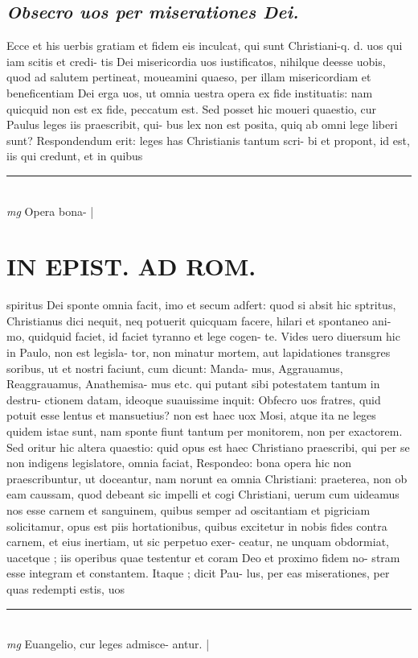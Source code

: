 \documentclass{article}
\begin{document}
\begin{pages}
\subsection*{\textit{Obsecro uos per miserationes Dei. }}\pstart Ecce et his uerbis gratiam et fidem eis inculcat, qui sunt Christiani-q. d. uos qui iam scitis et credi- tis Dei misericordia uos iustificatos, nihilque deesse uobis, quod ad salutem pertineat, moueamini quaeso, per illam misericordiam et beneficentiam Dei erga uos, ut omnia uestra opera ex fide instituatis: nam quicquid non est ex fide, peccatum est. Sed posset hic moueri quaestio, cur Paulus leges iis praescribit, qui- bus lex non est posita, quiq ab omni lege liberi sunt? Respondendum erit: leges has Christianis tantum scri- bi et propont, id est, iis qui credunt, et in quibus  \pend
\vspace{0.5cm}\noindent
\vspace{0.2cm}\rule{1cm}{0.2pt}\\ 
\hspace{0.2cm}\textit{mg}
\footnotesize Opera bona- 
\normalsize| 
\section*{IN EPIST. AD ROM.  }
\marginpar{[ p.139 ]}\pstart spiritus Dei sponte omnia facit, imo et secum adfert: quod si absit hic sptritus, Christianus dici nequit, neq potuerit quicquam facere, hilari et spontaneo ani- mo, quidquid faciet, id faciet tyranno et lege cogen- te. Vides uero diuersum hic in Paulo, non est legisla- tor, non minatur mortem, aut lapidationes transgres soribus, ut et nostri faciunt, cum dicunt: Manda- mus, Aggrauamus, Reaggrauamus, Anathemisa- mus etc. qui putant sibi potestatem tantum in destru- ctionem datam, ideoque suauissime inquit: Obfecro uos fratres, quid potuit esse lentus et mansuetius? non est haec uox Mosi, atque ita ne leges quidem istae sunt, nam sponte fiunt tantum per monitorem, non per exactorem. Sed oritur hic altera quaestio: quid opus est haec Christiano praescribi, qui per se non indigens legislatore, omnia faciat, Respondeo: bona opera hic non praescribuntur, ut doceantur, nam norunt ea omnia Christiani: praeterea, non ob eam caussam, quod debeant sic impelli et cogi Christiani, uerum cum uideamus nos esse carnem et sanguinem, quibus semper ad oscitantiam et pigriciam solicitamur, opus est piis hortationibus, quibus excitetur in nobis fides contra carnem, et eius inertiam, ut sic perpetuo exer- ceatur, ne unquam obdormiat, uacetque ; iis operibus quae testentur et coram Deo et proximo fidem no- stram esse integram et constantem. Itaque ; dicit Pau- lus, per eas miserationes, per quas redempti estis, uos  \pend
\vspace{0.5cm}\noindent
\vspace{0.2cm}\rule{1cm}{0.2pt}\\ 
\hspace{0.2cm}\textit{mg}
\footnotesize Euangelio, cur leges admisce- antur.  
\normalsize| 

\end{pages}
\end{document}
